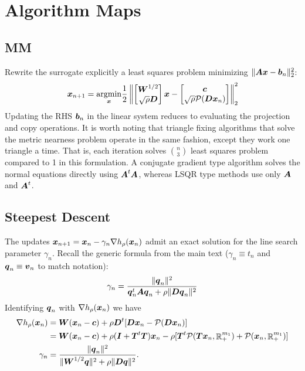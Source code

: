 \documentclass{article}
\begin{document}
\section*{\center Algorithm Maps}

\subsection*{MM}

Rewrite the surrogate explicitly a least squares problem minimizing $\|\boldsymbol{A} \boldsymbol{x} - \boldsymbol{b}_{n}\|^{2}_{2}$:
\begin{equation*}
  \boldsymbol{x}_{n+1} = \underset{\boldsymbol{x}}{\mathop{\rm argmin}\nolimits} \frac{1}{2} \left\|
    \begin{bmatrix}
      \boldsymbol{W}^{1/2} \\
      \sqrt{\rho} \boldsymbol{D}
    \end{bmatrix} \boldsymbol{x}
    -
    \begin{bmatrix}
      \boldsymbol{c} \\
      \sqrt{\rho} \mathcal{P}(\boldsymbol{D} \boldsymbol{x}_{n})
    \end{bmatrix}
  \right\|_{2}^{2}
\end{equation*}
Updating the RHS $\boldsymbol{b}_{n}$ in the linear system reduces to evaluating the projection and copy operations.
It is worth noting that triangle fixing algorithms that solve the metric nearness problem operate in the same fashion, except they work one triangle a time.
That is, each iteration solves $\binom{n}{3}$ least squares problem compared to 1 in this formulation.
A conjugate gradient type algorithm solves the normal equations directly using $\boldsymbol{A}^{t}\boldsymbol{A}$, whereas LSQR type methods use only $\boldsymbol{A}$ and $\boldsymbol{A}^{t}$.

\subsection*{Steepest Descent}

The updates $\boldsymbol{x}_{n+1} = \boldsymbol{x}_{n} - \gamma_{n} \nabla h_{\rho}(\boldsymbol{x}_{n})$ admit an exact solution for the line search parameter $\gamma_{n}$.
Recall the generic formula from the main text ($\gamma_{n} \equiv t_{n}$ and $\boldsymbol{q}_{n} \equiv \boldsymbol{v}_{n}$ to match notation):
\begin{equation*}
  \gamma_{n} = \frac{\|\boldsymbol{q}_{n}\|^{2}}{\boldsymbol{q}_{n}^{t}\boldsymbol{A}\boldsymbol{q}_{n} + \rho \|\boldsymbol{D} \boldsymbol{q}_{n}\|^{2}}
\end{equation*}
Identifying $\boldsymbol{q}_{n}$ with $\nabla h_{\rho}(\boldsymbol{x}_{n})$ we have
\begin{align*}
  \nabla h_{\rho}(\boldsymbol{x}_{n})
  &= \boldsymbol{W}(\boldsymbol{x}_{n} - \boldsymbol{c}) + \rho \boldsymbol{D}^{t} [\boldsymbol{D} \boldsymbol{x}_{n} - \mathcal{P}(\boldsymbol{D} \boldsymbol{x}_{n})] \\
  &= \boldsymbol{W}(\boldsymbol{x}_{n} - \boldsymbol{c}) + \rho (\boldsymbol{I} + \boldsymbol{T}^{t}\boldsymbol{T}) \boldsymbol{x}_{n} - \rho[\boldsymbol{T}^{t} \mathcal{P}(\boldsymbol{T} \boldsymbol{x}_{n}, \mathop{\mathbb{R}}\nolimits_{+}^{m_{1}}) + \mathcal{P}(\boldsymbol{x}_{n}, \mathop{\mathbb{R}}\nolimits_{+}^{m_{1}})] \\
  \gamma_{n}
  &=
  \frac{\|\boldsymbol{q}_{n}\|^{2}}{\|\boldsymbol{W}^{1/2} \boldsymbol{q}\|^{2} + \rho \|\boldsymbol{D} \boldsymbol{q}\|^{2}}.
\end{align*}
\end{document}

